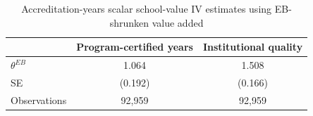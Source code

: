 \begin{table}[!htbp]
\centering
\caption{Accreditation-years scalar school-value IV estimates using EB-shrunken value added}
\label{tab:scalar_school_value_iv_accreditation_expected_va_eb}
\begin{tabular}{lcc}
\toprule
 & Program-certified years & Institutional quality \\
\midrule
$\theta^{EB}$ & 1.064 & 1.508 \\
SE & (0.192) & (0.166) \\
Observations & 92,959 & 92,959 \\
\bottomrule
\end{tabular}
\end{table}
